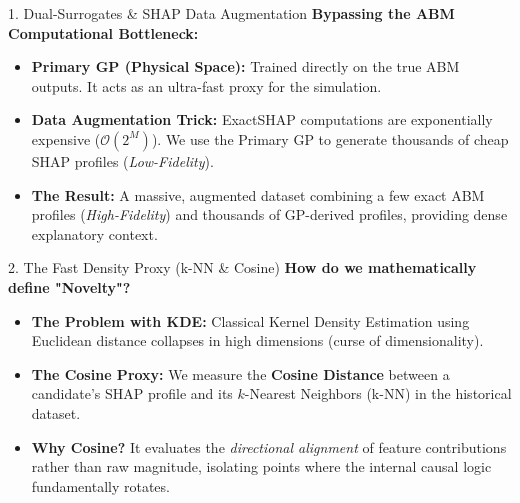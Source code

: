 \documentclass[10pt, aspectratio=169]{beamer}
\begin{document}
\begin{frame}[fragile]{1. Dual-Surrogates \& SHAP Data Augmentation}
  \textbf{Bypassing the ABM Computational Bottleneck:}
  \begin{itemize}
      \item \textbf{Primary GP (Physical Space):} Trained directly on the true ABM outputs. It acts as an ultra-fast proxy for the simulation.
      \item \textbf{Data Augmentation Trick:} ExactSHAP computations are exponentially expensive ($\mathcal{O}(2^M)$). We use the Primary GP to generate thousands of cheap SHAP profiles (\textit{Low-Fidelity}).
      \item \textbf{The Result:} A massive, augmented dataset combining a few exact ABM profiles (\textit{High-Fidelity}) and thousands of GP-derived profiles, providing dense explanatory context.
  \end{itemize}
\end{frame}

\begin{frame}[fragile]{2. The Fast Density Proxy (k-NN \& Cosine)}
  \textbf{How do we mathematically define "Novelty"?}
  \begin{itemize}
      \item \textbf{The Problem with KDE:} Classical Kernel Density Estimation using Euclidean distance collapses in high dimensions (curse of dimensionality).
      \item \textbf{The Cosine Proxy:} We measure the \textbf{Cosine Distance} between a candidate's SHAP profile and its $k$-Nearest Neighbors (k-NN) in the historical dataset.
      \item \textbf{Why Cosine?} It evaluates the \textit{directional alignment} of feature contributions rather than raw magnitude, isolating points where the internal causal logic fundamentally rotates.
  \end{itemize}
\end{frame}
\end{document}
